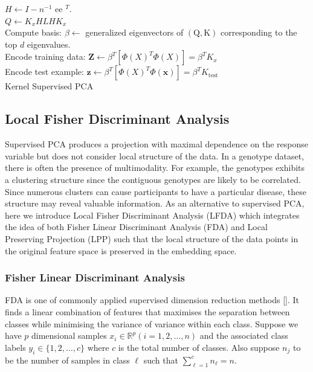 \documentclass[a4paper,12pt]{article}
\begin{document}
\begin{algorithm}[H]
\SetAlgoLined
 $H \leftarrow I-n^{-1}$ ee $^{T}$.\\
 $Q \leftarrow {K}_{x} H L H {K}_{x}$ \\ 
 Compute basis: $\beta \leftarrow$ generalized eigenvectors of $(\mathrm{Q}, \mathrm{K})$ corresponding to the top $d$ eigenvalues. \\
 Encode training data: $\mathbf{Z} \leftarrow \beta^{T}\left[\Phi(X)^{T} \Phi(X)\right]=\beta^{T} {K}_{x}$ \\
 Encode test example: $\mathbf{z} \leftarrow \beta^{T}\left[\Phi(X)^{T} \Phi(\mathbf{x})\right]=\beta^{T} K_{\text {test}}$ \\
\caption{Kernel Supervised PCA}
\end{algorithm}

%
%
%
%
%
%
\subsection{Local Fisher Discriminant Analysis}
Supervised PCA produces a projection with maximal dependence on the response variable but does not consider local structure of the data. In a genotype dataset, there is often the presence of multimodality. For example, the genotypes exhibits a  clustering structure since the contiguous genotypes are likely to be correlated. Since numerous clusters can cause participants to have a particular disease, these structure may reveal valuable information. As an alternative to supervised PCA, here we introduce Local Fisher Discriminant Analysis (LFDA) which integrates the idea of both Fisher Linear Discriminant Analysis (FDA) and Local Preserving Projection (LPP) such that the local structure of the data points in the original feature space is preserved in the embedding space.

\subsubsection{Fisher Linear Discriminant Analysis}
FDA is one of commonly applied supervised dimension reduction methods [\cite{fisher1936use}]. It finds a linear combination of features that maximises the separation between classes while minimising the variance of variance within each class. Suppose we have $p$ dimensional samples $x_{i} \in \mathbb{R}^{p}(i=1,2, \ldots, n)$ and the associated class labels $y_{i} \in\{1,2, \ldots, c\}$ where $c$ is the total number of classes. Also suppose $n_{j}$ to be the number of samples in class $\ell$ such that $\sum_{\ell=1}^{c} n_{\ell}=n$.
\end{document}
